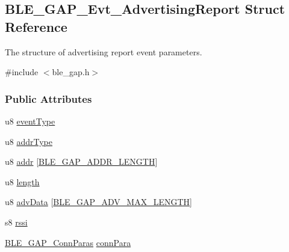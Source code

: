 \hypertarget{struct_b_l_e___g_a_p___evt___advertising_report}{}\subsection{B\+L\+E\+\_\+\+G\+A\+P\+\_\+\+Evt\+\_\+\+Advertising\+Report Struct Reference}
\label{struct_b_l_e___g_a_p___evt___advertising_report}


The structure of advertising report event parameters.  




{\ttfamily \#include $<$ble\+\_\+gap.\+h$>$}

\subsubsection*{Public Attributes}
\begin{DoxyCompactItemize}
\item 
u8 \hyperlink{struct_b_l_e___g_a_p___evt___advertising_report_a52c95f42c577028c399a40f907665cf9}{event\+Type}
\item 
u8 \hyperlink{struct_b_l_e___g_a_p___evt___advertising_report_ae3a3904704b7074fb51b44efe423ab3e}{addr\+Type}
\item 
u8 \hyperlink{struct_b_l_e___g_a_p___evt___advertising_report_aeb8a9404068c08f69561cf6603114698}{addr} \mbox{[}\hyperlink{group___b_l_e___g_a_p_gac59af0a1a5d256432e9d01cdcd35215d}{B\+L\+E\+\_\+\+G\+A\+P\+\_\+\+A\+D\+D\+R\+\_\+\+L\+E\+N\+G\+TH}\mbox{]}
\item 
u8 \hyperlink{struct_b_l_e___g_a_p___evt___advertising_report_a2febfcc770413b92c5258fc82cf9771d}{length}
\item 
u8 \hyperlink{struct_b_l_e___g_a_p___evt___advertising_report_a39718dfa1e62ce818edac89c1d909049}{adv\+Data} \mbox{[}\hyperlink{group___b_l_e___g_a_p___m_a_x___a_d_v___l_e_n_gaef184d7f23b1fa255e4ebfff7be16421}{B\+L\+E\+\_\+\+G\+A\+P\+\_\+\+A\+D\+V\+\_\+\+M\+A\+X\+\_\+\+L\+E\+N\+G\+TH}\mbox{]}
\item 
s8 \hyperlink{struct_b_l_e___g_a_p___evt___advertising_report_a73e74502aebf254922c809afd71d9661}{rssi}
\item 
\hyperlink{struct_b_l_e___g_a_p___conn_paras}{B\+L\+E\+\_\+\+G\+A\+P\+\_\+\+Conn\+Paras} \hyperlink{struct_b_l_e___g_a_p___evt___advertising_report_a5857dc4ab899fb2104c4e4fa09fda080}{conn\+Para}
\end{DoxyCompactItemize}


